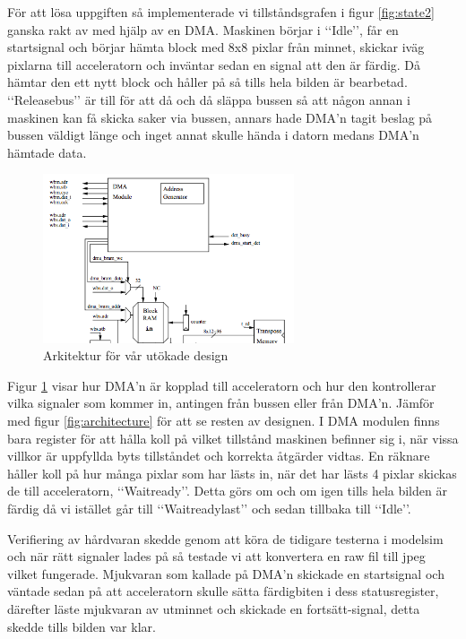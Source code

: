 \documentclass[a4paper]{article}
\begin{document}
För att lösa uppgiften så implementerade vi tillståndsgrafen i figur
\ref{fig:state2} ganska rakt av med hjälp av en DMA. Maskinen börjar i
\lq\lq{}Idle\rq\rq{}, får en startsignal och börjar hämta block med 8x8
pixlar från minnet, skickar iväg pixlarna till acceleratorn och inväntar
sedan en signal att den är färdig. Då hämtar den ett nytt block och
håller på så tills hela bilden är bearbetad. \lq\lq{}Releasebus\rq\rq{}
är till för att då och då släppa bussen så att någon annan i maskinen
kan få skicka saker via bussen, annars hade DMA\rq{}n tagit beslag på
bussen väldigt länge och inget annat skulle hända i datorn medans
DMA\rq{}n hämtade data.

\begin{figure}[h]
\centering
\includegraphics[width=280px]{architecturelab3.png}
\caption{Arkitektur för vår utökade design}
\label{fig:arch3}
\end{figure}

Figur \ref{fig:arch3} visar hur DMA\rq{}n är kopplad till acceleratorn
och hur den kontrollerar vilka signaler som kommer in, antingen från
bussen eller från DMA\rq{}n. Jämför med figur \ref{fig:architecture} för
att se resten av designen. I DMA modulen finns bara register för att
hålla koll på vilket tillstånd maskinen befinner sig i, när vissa
villkor är uppfyllda byts tillståndet och korrekta åtgärder vidtas. En
räknare håller koll på hur många pixlar som har lästs in, när det har
lästs 4 pixlar skickas de till acceleratorn, \lq\lq{}Waitready\rq\rq{}.
Detta görs om och om igen tills hela bilden är färdig då vi istället går
till \lq\lq{}Waitreadylast\rq\rq{} och sedan tillbaka till
\lq\lq{}Idle\rq\rq{}.

Verifiering av hårdvaran skedde genom att köra de tidigare testerna i
modelsim och när rätt signaler lades på så testade vi att konvertera en
raw fil till jpeg vilket fungerade. Mjukvaran som kallade på DMA\rq{}n
skickade en startsignal och väntade sedan på att acceleratorn skulle
sätta färdigbiten i dess statusregister, därefter läste mjukvaran av
utminnet och skickade en fortsätt-signal, detta skedde tills bilden var
klar.
\end{document}
